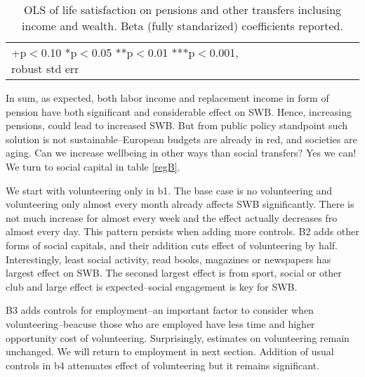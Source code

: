 \documentclass[10pt, letterpaper]{article}
\begin{document}
\begin{spacing}{1.4}
\begin{spacing}{.9}
\begin{table}[H]\centering \caption{OLS of life satisfaction on  pensions and
    other transfers inclusing income and wealth. Beta (fully standarized) coefficients reported.}  \begin{scriptsize} \begin{tabular}{p{1.8in}p{.5in}p{.5in}p{.5in}p{.5in}p{.5in}p{.5in}p{.5in}p{.5in}p{.5in}p{.4in}p{.5in}p{.4in}}\hline 
      \hline\multicolumn{5}{l}{+p$<$0.10 *p$<$0.05 **p$<$0.01 ***p$<$0.001,
        robust std err} \end{tabular}\label{regA} \end{scriptsize}\end{table}
\end{spacing}


In sum, as expected, both labor income and replacement income in form of pension
have both significant and considerable effect on SWB. Hence, increasing
pensions, could lead to increased SWB. But from public policy standpoint such
solution is not sustainable--European budgets are already in red,  and societies are
aging. Can we increase wellbeing in other ways than social transfers? Yes we
can! We turn to social capital in table \ref{regB}.

We start with  volunteering only in b1. The base case is no volunteering and
 volunteering only almost every month already affects SWB significantly. There is not
much increase for almost every week and the effect actually decreases fro almost
every day. This pattern persists when adding more controls. B2 adds other forms
of social capitals, and their addition cuts effect of volunteering by half.
%
 Interestingly, least social activity,  read books, magazines or newspapers has 
largest effect on SWB. The seconsd largest effect is from sport, social or other
club and large effect is
expected--social engagement is key for SWB.

B3 adds  controls for employment--an important factor to consider when
volunteering--beacuse those who are employed have less time and higher
opportunity cost of volunteering. Surprisingly, estimates on volunteering remain
unchanged. We will return to employment in next section.
Addition of usual controls in b4 attenuates effect of volunteering but it
remains significant.
 





\end{spacing}
\end{document}
